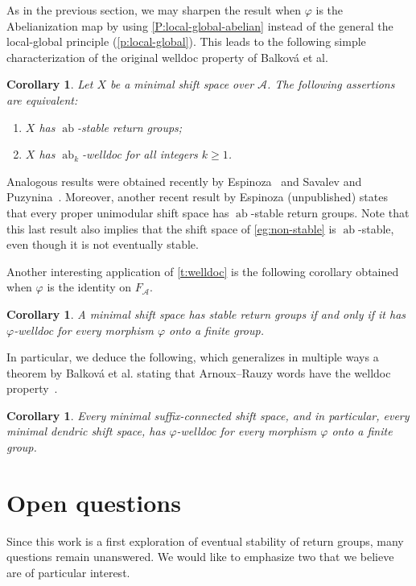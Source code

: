 \documentclass{amsart}
\newcommand*{\cA}{\mathcal{A}}
\newcommand*{\ab}{\operatorname{ab}}
\theoremstyle{plain}
\newtheorem{corollary}[theorem]{Corollary}
\theoremstyle{definition}
\theoremstyle{remark}
\begin{document}
As in the previous section, we may sharpen the result when $\varphi$ is the Abelianization map by using \cref{P:local-global-abelian} instead of the general the local-global principle (\cref{p:local-global}).
This leads to the following simple characterization of the original welldoc property of Balková et al.
\begin{corollary}\label{t:abelian-welldoc}
    Let $X$ be a minimal shift space over $\cA$. The following assertions are equivalent:
    \begin{enumerate}
        \item $X$ has $\ab$-stable return groups;
        \item $X$ has $\ab_k$-welldoc for all integers $k\geq 1$.
    \end{enumerate}
\end{corollary}

Analogous results were obtained recently by Espinoza~\cite{pre/Espinoza} and Savalev and Puzynina~\cite{th/Savelev2024}. Moreover, another recent result by Espinoza (unpublished) states that every proper unimodular shift space has $\ab$-stable return groups. Note that this last result also implies that the shift space of \cref{eg:non-stable} is $\ab$-stable, even though it is not eventually stable.

Another interesting application of \cref{t:welldoc} is the following corollary obtained when $\varphi$ is the identity on $F_\cA$.
\begin{corollary}
    A minimal shift space has stable return groups if and only if it has $\varphi$-welldoc for every morphism $\varphi$ onto a finite group.
\end{corollary}

In particular, we deduce the following, which generalizes in multiple ways a theorem by Balková et al. stating that Arnoux--Rauzy words have the welldoc property~\cite{Balkova2016}. 
\begin{corollary}\label{c:welldoc}
    Every minimal suffix-connected shift space, and in particular, every minimal dendric shift space, has $\varphi$-welldoc for every morphism $\varphi$ onto a finite group.
\end{corollary}

\section{Open questions}

Since this work is a first exploration of eventual stability of return groups, many questions remain unanswered. We would like to emphasize two that we believe are of particular interest.
\end{document}
